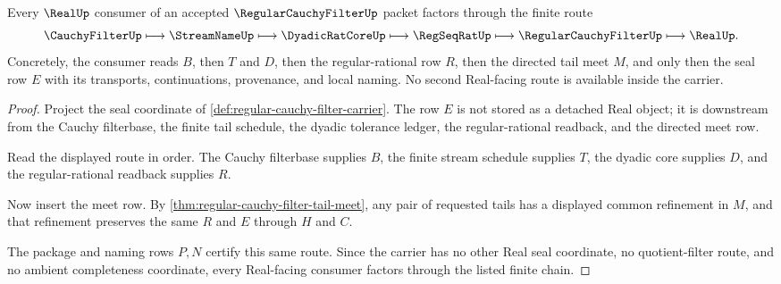 \begin{theorem}
\label{thm:regular-cauchy-filter-real-seal-route}
Every $\RealUp$ consumer of an accepted $\RegularCauchyFilterUp$ packet factors through the finite route
$$
\CauchyFilterUp \longmapsto \StreamNameUp \longmapsto \DyadicRatCoreUp \longmapsto \RegSeqRatUp \longmapsto \RegularCauchyFilterUp \longmapsto \RealUp .
$$
Concretely, the consumer reads $B$, then $T$ and $D$, then the regular-rational row $R$, then the directed tail meet $M$, and only then the seal row $E$ with its transports, continuations, provenance, and local naming. No second Real-facing route is available inside the carrier.
\end{theorem}
\begin{proof}
Project the seal coordinate of \autoref{def:regular-cauchy-filter-carrier}. The row $E$ is not stored as a detached Real object; it is downstream from the Cauchy filterbase, the finite tail schedule, the dyadic tolerance ledger, the regular-rational readback, and the directed meet row.

Read the displayed route in order. The Cauchy filterbase supplies $B$, the finite stream schedule supplies $T$, the dyadic core supplies $D$, and the regular-rational readback supplies $R$.

Now insert the meet row. By \autoref{thm:regular-cauchy-filter-tail-meet}, any pair of requested tails has a displayed common refinement in $M$, and that refinement preserves the same $R$ and $E$ through $H$ and $C$.

The package and naming rows $P,N$ certify this same route. Since the carrier has no other Real seal coordinate, no quotient-filter route, and no ambient completeness coordinate, every Real-facing consumer factors through the listed finite chain.
\end{proof}

